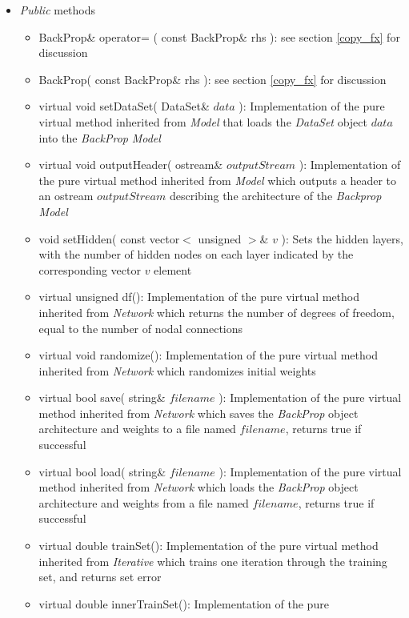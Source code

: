 \documentclass{report}
\begin{document}
\begin{itemize}

\item {\em Public} methods

\begin{itemize}
\item BackProp\& operator= ( const BackProp\& rhs ): see section
      \ref{copy_fx} for discussion
\item BackProp( const BackProp\& rhs ): see section \ref{copy_fx}
      for discussion
\item virtual void setDataSet( DataSet\& $data$ ): Implementation of
      the pure virtual method inherited from {\em Model} that loads
      the {\em DataSet} object $data$ into the {\em BackProp} {\em
      Model}
\item virtual void outputHeader( ostream\& $outputStream$ ):
      Implementation of the pure virtual method inherited from {\em
      Model} which outputs a header to an ostream $outputStream$
      describing the architecture of the {\em Backprop} {\em Model}
\item void setHidden( const vector$<$ unsigned $>$\& $v$ ): Sets the
      hidden layers, with the number of hidden nodes on each layer
      indicated by the corresponding vector $v$ element
\item virtual unsigned df(): Implementation of the pure virtual method
      inherited from {\em Network} which returns the number of degrees
      of freedom, equal to the number of nodal connections
\item virtual void randomize(): Implementation of the pure virtual
      method inherited from {\em Network} which randomizes initial
      weights
\item virtual bool save( string\& $filename$ ): Implementation of the
      pure virtual method inherited from {\em Network} which saves the
      {\em BackProp} object architecture and weights to a file named
      $filename$, returns true if successful
\item virtual bool load( string\& $filename$ ): Implementation of the
      pure virtual method inherited from {\em Network} which loads the
      {\em BackProp} object architecture and weights from a file named
      $filename$, returns true if successful
\item virtual double trainSet(): Implementation of the pure virtual
      method inherited from {\em Iterative} which trains one iteration
      through the training set, and returns set error
\item virtual double innerTrainSet(): Implementation of the pure

\end{itemize}
\end{itemize}
\end{document}
